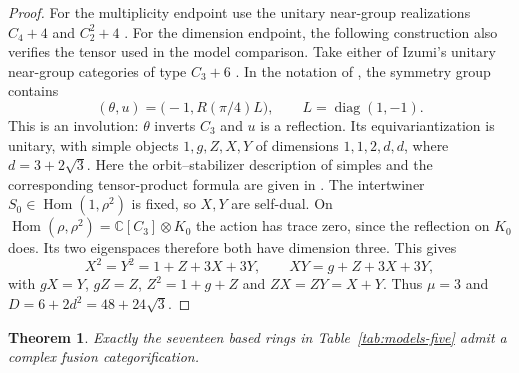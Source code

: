 \documentclass[11pt,a4paper]{article}
\newtheorem{theorem}{Theorem}[section]
\numberwithin{equation}{section}
\begin{document}
\begin{proof}
For the multiplicity endpoint use the unitary near-group
realizations $C_4+4$ and $C_2^2+4$ \cite[Examples~9.5--9.6]{Izumi}.
For the dimension endpoint, the following construction also verifies
the tensor used in the model comparison. Take either of Izumi's unitary near-group
categories of type $C_3+6$ \cite[Theorem~10.19]{Izumi}. In the notation of
\cite[Lemma~13.1 and Example~13.10]{Izumi}, the symmetry group contains
\[
 (\theta,u)=\bigl(-1,R(\pi/4)L\bigr),\qquad L=\operatorname{diag}(1,-1).
\]
This is an involution: $\theta$ inverts $C_3$ and $u$ is a reflection.
Its equivariantization is unitary, with simple objects $1,g,Z,X,Y$
of dimensions $1,1,2,d,d$, where $d=3+2\sqrt3$.
Here the orbit--stabilizer description of simples and the corresponding
tensor-product formula are given in
\cite[Corollary~2.13 and Theorem~3.9]{BurciuNatale}.
The intertwiner $S_0\in\operatorname{Hom}(1,\rho^2)$ is fixed, so
$X,Y$ are self-dual. On
$\operatorname{Hom}(\rho,\rho^2)=\mathbb C[C_3]\otimes K_0$
the action has trace zero, since the reflection on $K_0$ does.
Its two eigenspaces therefore both have dimension three. This gives
\[
 X^2=Y^2=1+Z+3X+3Y,\qquad XY=g+Z+3X+3Y,
\]
with $gX=Y$, $gZ=Z$, $Z^2=1+g+Z$ and $ZX=ZY=X+Y$.
Thus $\mu=3$ and $D=6+2d^2=48+24\sqrt3$.
\end{proof}
\begin{theorem}\label{thm:frontier-final}
Exactly the seventeen based rings in Table~\ref{tab:models-five} admit a complex fusion categorification.
\end{theorem}
\end{document}
